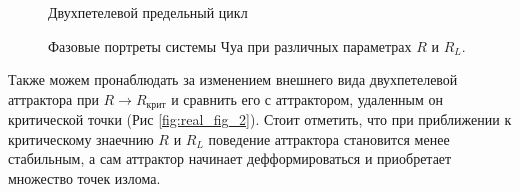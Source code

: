 \documentclass[12pt]{article}
\begin{document}
\begin{figure}[H]
\begin{minipage}[h]{0.47\linewidth}
	\end{minipage}
	\vfill
	\begin{minipage}[h]{0.47\linewidth}
		 Двухпетелевой предельный цикл
	\end{minipage}
	\caption{Фазовые портреты системы Чуа при различных параметрах $R$ и $R_L$.}
	\label{fig:real_fig_1}
\end{figure}

Также можем пронаблюдать за изменением внешнего вида двухпетелевой аттрактора при $R \rightarrow R_{\text{крит}}$ и сравнить его с аттрактором, удаленным он критической точки (Рис \ref{fig:real_fig_2}).
Стоит отметить, что при приближении к критическому знаечнию $R$ и $R_L$ поведение аттрактора становится менее стабильным, а сам аттрактор начинает дефформироваться и приобретает множество точек излома.
\end{document}
